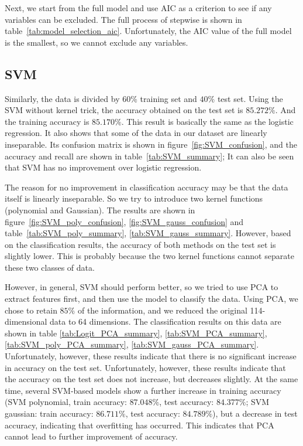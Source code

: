 \documentclass[11pt, a4paper, jou]{apa7}
\begin{document}
    Next, we start from the full model and use AIC as a criterion to see if any variables can be excluded. The full process of stepwise is shown in table~\ref{tab:model_selection_aic}. Unfortunately, the AIC value of the full model is the smallest, so we cannot exclude any variables. 

\subsection{SVM}
Similarly, the data is divided by $60\%$ training set and $40\%$ test set. Using the SVM without kernel trick, the accuracy obtained on the test set is $85.272\%$. And the training accuracy is $85.170\%$. This result is basically the same as the logistic regression. It also shows that some of the data in our dataset are linearly inseparable. Its confusion matrix is shown in figure~\ref{fig:SVM_confusion}, and the accuracy and recall are shown in table~\ref{tab:SVM_summary}; It can also be seen that SVM has no improvement over logistic regression. 

The reason for no improvement in classification accuracy may be that the data itself is linearly inseparable. So we try to introduce two kernel functions (polynomial and Gaussian). The results are shown in figure~\ref{fig:SVM_poly_confusion}, \ref{fig:SVM_gauss_confusion} and table~\ref{tab:SVM_poly_summary}, \ref{tab:SVM_gauss_summary}. However, based on the classification results, the accuracy of both methods on the test set is slightly lower. This is probably because the two kernel functions cannot separate these two classes of data. 

However, in general, SVM should perform better, so we tried to use PCA to extract features first, and then use the model to classify the data. Using PCA, we chose to retain $85\%$ of the information, and we reduced the original 114-dimensional data to 64 dimensions. The classification results on this data are shown in table \ref{tab:Logit_PCA_summary}, \ref{tab:SVM_PCA_summary}, \ref{tab:SVM_poly_PCA_summary}, \ref{tab:SVM_gauss_PCA_summary}. 
Unfortunately, however, these results indicate that there is no significant increase in accuracy on the test set. Unfortunately, however, these results indicate that the accuracy on the test set does not increase, but decreases slightly. At the same time, several SVM-based models show a further increase in training accuracy (SVM polynomial, train accuracy: $87.048\%$, test accuracy: $84.377\%$; SVM gaussian: train accuracy: $86.711\%$, test accuracy: $84.789\%$), but a decrease in test accuracy, indicating that overfitting has occurred. This indicates that PCA cannot lead to further improvement of accuracy. 
\end{document}
